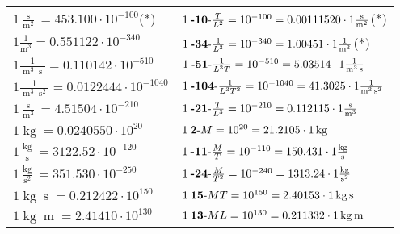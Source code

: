 \begin{center}
\begin{longtable}{l l}
{\color{black}$1 \bm{\mathrm{ }}\frac{\operatorname{s}}{\operatorname{m}^2} = 453.100\cdot10^{-100} $}\quad(*)&
	{\color{black}$1\:\text{\textbf{-10}-} \frac{T}{L^2}=10^{-100} = 0.00111520 \cdot 1 \bm{\mathrm{ }}\frac{\operatorname{s}}{\operatorname{m}^2}$}\quad(*)\\
{\color{black}$1 \bm{\mathrm{ }}\frac1{\operatorname{m}^3} = 0.551122\cdot10^{-340} $}&
	{\color{black}$1\:\text{\textbf{-34}-} \frac1{L^3}=10^{-340} = 1.00451 \cdot 1 \bm{\mathrm{ }}\frac1{\operatorname{m}^3}$}\quad(*)\\
{\color{black}$1 \bm{\mathrm{ }}\frac1{\operatorname{m}^3\operatorname{s}} = 0.110142\cdot10^{-510} $}&
	{\color{black}$1\:\text{\textbf{-51}-} \frac1{L^3T}=10^{-510} = 5.03514 \cdot 1 \bm{\mathrm{ }}\frac1{\operatorname{m}^3\operatorname{s}}$}\\
{\color{black}$1 \bm{\mathrm{ }}\frac1{\operatorname{m}^3\operatorname{s}^2} = 0.0122444\cdot10^{-1040} $}&
	{\color{black}$1\:\text{\textbf{-104}-} \frac1{L^3T^2}=10^{-1040} = 41.3025 \cdot 1 \bm{\mathrm{ }}\frac1{\operatorname{m}^3\operatorname{s}^2}$}\\
{\color{black}$1 \bm{\mathrm{ }}\frac{\operatorname{s}}{\operatorname{m}^3} = 4.51504\cdot10^{-210} $}&
	{\color{black}$1\:\text{\textbf{-21}-} \frac{T}{L^3}=10^{-210} = 0.112115 \cdot 1 \bm{\mathrm{ }}\frac{\operatorname{s}}{\operatorname{m}^3}$}\\
\hline{\color{black}$1 \bm{\mathrm{ }}\operatorname{kg} = 0.0240550\cdot10^{20} $}&
	{\color{black}$1\:\text{\textbf{2}-} M=10^{20} = 21.2105 \cdot 1 \bm{\mathrm{ }}\operatorname{kg}$}\\
{\color{black}$1 \bm{\mathrm{ }}\frac{\operatorname{kg}}{\operatorname{s}} = 3122.52\cdot10^{-120} $}&
	{\color{black}$1\:\text{\textbf{-11}-} \frac{M}{T}=10^{-110} = 150.431 \cdot 1 \bm{\mathrm{ }}\frac{\operatorname{kg}}{\operatorname{s}}$}\\
{\color{black}$1 \bm{\mathrm{ }}\frac{\operatorname{kg}}{\operatorname{s}^2} = 351.530\cdot10^{-250} $}&
	{\color{black}$1\:\text{\textbf{-24}-} \frac{M}{T^2}=10^{-240} = 1313.24 \cdot 1 \bm{\mathrm{ }}\frac{\operatorname{kg}}{\operatorname{s}^2}$}\\
{\color{black}$1 \bm{\mathrm{ }}\operatorname{kg}\operatorname{s} = 0.212422\cdot10^{150} $}&
	{\color{black}$1\:\text{\textbf{15}-} MT=10^{150} = 2.40153 \cdot 1 \bm{\mathrm{ }}\operatorname{kg}\operatorname{s}$}\\
{\color{black}$1 \bm{\mathrm{ }}\operatorname{kg}\operatorname{m} = 2.41410\cdot10^{130} $}&
	{\color{black}$1\:\text{\textbf{13}-} ML=10^{130} = 0.211332 \cdot 1 \bm{\mathrm{ }}\operatorname{kg}\operatorname{m}$}\\

\end{longtable}
\end{center}
